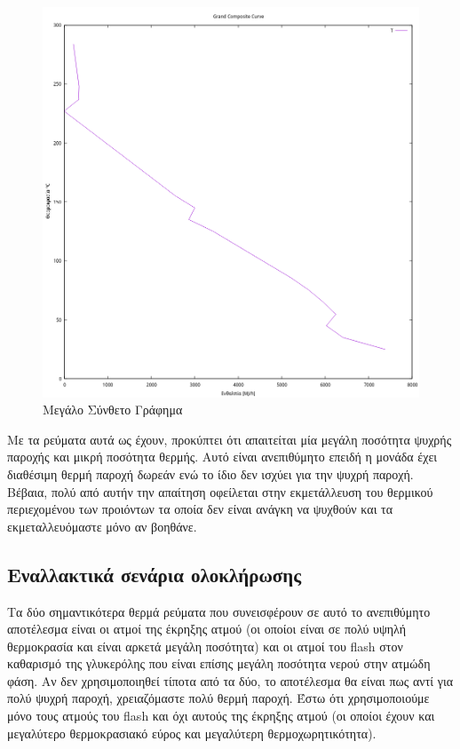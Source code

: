 \documentclass[11pt]{article}
\begin{document}
\begin{figure}[htbp]
\centering
\includegraphics[width=.9\linewidth]{Diagrams/grand_composite_curve.png}
\caption{Μεγάλο Σύνθετο Γράφημα}
\end{figure}

Με τα ρεύματα αυτά ως έχουν, προκύπτει ότι απαιτείται μία μεγάλη ποσότητα ψυχρής παροχής και μικρή ποσότητα θερμής. Αυτό είναι ανεπιθύμητο επειδή η μονάδα έχει διαθέσιμη θερμή παροχή δωρεάν ενώ το ίδιο δεν ισχύει για την ψυχρή παροχή. Βέβαια, πολύ από αυτήν την απαίτηση οφείλεται στην εκμετάλλευση του θερμικού περιεχομένου των προιόντων τα οποία δεν είναι ανάγκη να ψυχθούν και τα εκμεταλλευόμαστε μόνο αν βοηθάνε.

\subsection{Εναλλακτικά σενάρια ολοκλήρωσης}
\label{sec:orgc6057a7}

Τα δύο σημαντικότερα θερμά ρεύματα που συνεισφέρουν σε αυτό το ανεπιθύμητο αποτέλεσμα είναι οι ατμοί της έκρηξης ατμού (οι οποίοι είναι σε πολύ υψηλή θερμοκρασία και είναι αρκετά μεγάλη ποσότητα) και οι ατμοί του flash στον καθαρισμό της γλυκερόλης που είναι επίσης μεγάλη ποσότητα νερού στην ατμώδη φάση. Αν δεν χρησιμοποιηθεί τίποτα από τα δύο, το αποτέλεσμα θα είναι πως αντί για πολύ ψυχρή παροχή, χρειαζόμαστε πολύ θερμή παροχή. Έστω ότι χρησιμοποιούμε μόνο τους ατμούς του flash και όχι αυτούς της έκρηξης ατμού (οι οποίοι έχουν και μεγαλύτερο θερμοκρασιακό εύρος και μεγαλύτερη θερμοχωρητικότητα).
\end{document}
